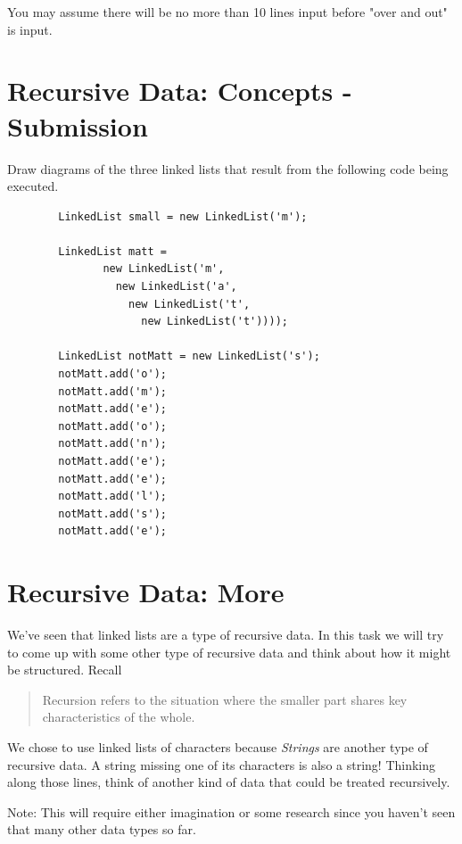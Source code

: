 \documentclass[twoside=false,DIV=14]{scrartcl}
\begin{document}
    You may assume there will be no more than 10 lines input before "over and out" is input.

\section{Recursive Data: Concepts - \bf Submission}
    Draw diagrams of the three linked lists that result from the following code being executed.

    \begin{lstlisting}
        LinkedList small = new LinkedList('m');
        
        LinkedList matt = 
               new LinkedList('m', 
                 new LinkedList('a', 
                   new LinkedList('t', 
                     new LinkedList('t'))));
        
        LinkedList notMatt = new LinkedList('s');
        notMatt.add('o');
        notMatt.add('m');
        notMatt.add('e');
        notMatt.add('o');
        notMatt.add('n');
        notMatt.add('e');
        notMatt.add('e');
        notMatt.add('l');
        notMatt.add('s');
        notMatt.add('e');
      \end{lstlisting}  


\section{Recursive Data: More}    
We've seen that linked lists are a type of recursive data.  In this task we will try to come up with some other type of recursive data and think about how it might be structured.  Recall
    \begin{quote}
    Recursion refers to the situation where the smaller part shares key characteristics of the whole.
    \end{quote}
    We chose to use linked lists of characters because \emph{Strings} are another type of recursive data.  A string missing one of its characters is also a string!  Thinking along those lines, think of another kind of data that could be treated recursively.

    Note:  This will require either imagination or some research since you haven't seen that many other data types so far. 
    
\end{document}
